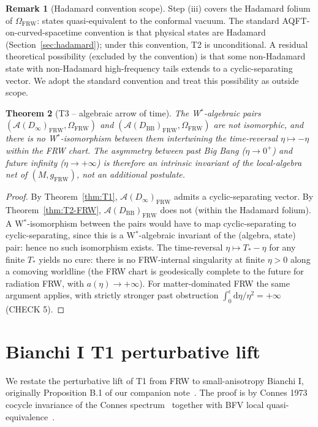 \documentclass[11pt]{article}
\newtheorem{theorem}{Theorem}
\theoremstyle{definition}
\newtheorem{remark}[theorem]{Remark}
\renewcommand{\AA}{\mathcal{A}}
\newcommand{\FRW}{\mathrm{FRW}}
\newcommand{\BB}{\mathrm{BB}}
\begin{document}
\begin{remark}[Hadamard convention scope]\label{rem:hadamard-scope}
Step (iii) covers the Hadamard folium of $\Omega_\FRW$: states quasi-equivalent to the conformal vacuum. The standard AQFT-on-curved-spacetime convention is that physical states are Hadamard (Section~\ref{sec:hadamard}); under this convention, T2 is unconditional. A residual theoretical possibility (excluded by the convention) is that some non-Hadamard state with non-Hadamard high-frequency tails extends to a cyclic-separating vector. We adopt the standard convention and treat this possibility as outside scope.
\end{remark}

\begin{theorem}[T3 -- algebraic arrow of time]\label{thm:T3}
The W$^*$-algebraic pairs $(\AA(D_\infty)_\FRW,\Omega_\FRW)$ and $(\AA(D_\BB)_\FRW,\Omega_\FRW)$ are not isomorphic, and there is no W$^*$-isomorphism between them intertwining the time-reversal $\eta\mapsto-\eta$ within the FRW chart. The asymmetry between past Big Bang ($\eta\to 0^+$) and future infinity ($\eta\to+\infty$) is therefore an intrinsic invariant of the local-algebra net of $(M,g_\FRW)$, not an additional postulate.
\end{theorem}

\begin{proof}
By Theorem~\ref{thm:T1}, $\AA(D_\infty)_\FRW$ admits a cyclic-separating vector. By Theorem~\ref{thm:T2-FRW}, $\AA(D_\BB)_\FRW$ does not (within the Hadamard folium). A W$^*$-isomorphism between the pairs would have to map cyclic-separating to cyclic-separating, since this is a W$^*$-algebraic invariant of the (algebra, state) pair: hence no such isomorphism exists. The time-reversal $\eta\mapsto T_*-\eta$ for any finite $T_*$ yields no cure: there is no FRW-internal singularity at finite $\eta>0$ along a comoving worldline (the FRW chart is geodesically complete to the future for radiation FRW, with $a(\eta)\to+\infty$). For matter-dominated FRW the same argument applies, with strictly stronger past obstruction $\int_0^\epsilon\mathrm{d}\eta/\eta^2=+\infty$ (CHECK 5).
\end{proof}

\section{Bianchi I T1 perturbative lift}\label{sec:bianchi-T1}

We restate the perturbative lift of T1 from FRW to small-anisotropy Bianchi I, originally Proposition B.1 of our companion note~\cite{bianchi_extension_opus}. The proof is by Connes 1973 cocycle invariance of the Connes spectrum~\cite{Connes1973} together with BFV local quasi-equivalence~\cite{BrunettiFredenhagenVerch2003,Verch1994}.
\end{document}

